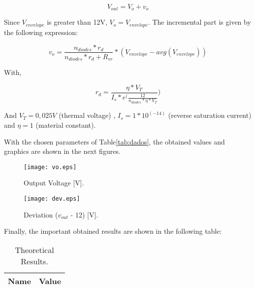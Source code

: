 \begin{equation}
  V_{out} = V_{o} + v_{o}  
  \label{eq:Vout}
\end{equation}

\par Since $V_{envelope}$ is greater than 12V, $V_{o} = V_{envelope}$. The incremental part is given by the following expression:

\begin{equation}
  v_{o} = \frac{n_{diodes}*r_{d}}{n_{diodes}*r_{d} + R_{vr}}*(V_{envelope} - avg(V_{envelope}))
  \label{eq:vo}
\end{equation}

\par With,

\begin{equation}
  r_{d} = \frac{\eta *V_{T}}{I_{s}*e^(\frac{12}{n_{diodes}*\eta *V_{T}}})
  \label{eq:rd}
\end{equation}

And $V_{T} = 0,025V$ (thermal voltage) , $I_{s} = 1*10^(-14)$ (reverse saturation current) and $\eta = 1$ (material constant).

\par With the chosen parameters of Table\ref{tab:dados}, the obtained values and graphics are shown in the next figures.

\begin{figure}[h] \centering
\texttt{[image: vo.eps]}
\caption{Output Voltage [V].}
\label{fig:vout}
\end{figure}

\newpage

\begin{figure}[h] \centering
\texttt{[image: dev.eps]}
\caption{Deviation ($v_{out}$ - 12) [V].}
\label{fig:deviation}
\end{figure}


\par Finally, the important obtained results are shown in the following table:

\begin{table}[h]
  \centering
  \begin{tabular}{|l|r|}
    \hline    
    {\bf Name} & {\bf Value}\\ \hline
    
  \end{tabular}
  \caption{Theoretical Results.}
  \label{tab:tr}
\end{table}

\newpage


